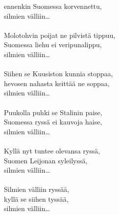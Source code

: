             ennenkin Suomessa korvennettu, \\
            silmien välliin… \\
\hspace{10mm} \\
            Molotohvin poijat ne pilvistä tippuu, \\
            Suomessa liehu ei veripunalippu, \\
            silmien välliin… \\
\hspace{10mm} \\
            Siihen se Kuusiston kunnia stoppaa, \\
            hevosen nahasta keittää ne soppaa, \\
            silmien välliin… \\
\hspace{10mm} \\
            Puukolla puhki se Stalinin paise, \\
            Suomessa ryssä ei kauvoja haise, \\
            silmien välliin… \\
\hspace{10mm} \\
            Kyllä nyt tuntee olevansa ryssä, \\
            Suomen Leijonan syleilyssä, \\
            silmien välliin… \\
\hspace{10mm} \\
            Silmien välliin ryssää, \\
            kyllä se siihen tyssää, \\
            silmien välliin… \\
